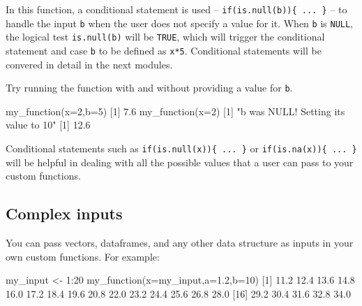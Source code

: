 \documentclass[
]{book}
\newenvironment{Shaded}{\begin{snugshade}}{\end{snugshade}}
\newcommand{\AttributeTok}[1]{\textcolor[rgb]{0.77,0.63,0.00}{#1}}
\newcommand{\DecValTok}[1]{\textcolor[rgb]{0.00,0.00,0.81}{#1}}
\newcommand{\FloatTok}[1]{\textcolor[rgb]{0.00,0.00,0.81}{#1}}
\newcommand{\FunctionTok}[1]{\textcolor[rgb]{0.00,0.00,0.00}{#1}}
\newcommand{\NormalTok}[1]{#1}
\newcommand{\OtherTok}[1]{\textcolor[rgb]{0.56,0.35,0.01}{#1}}
\newcommand{\SpecialCharTok}[1]{\textcolor[rgb]{0.00,0.00,0.00}{#1}}
\newcommand{\StringTok}[1]{\textcolor[rgb]{0.31,0.60,0.02}{#1}}
\begin{document}
In this function, a conditional statement is used -- \texttt{if(is.null(b))\{\ ...\ \}} -- to handle the input \texttt{b} when the user does not specify a value for it. When \texttt{b} is \texttt{NULL}, the logical test \texttt{is.null(b)} will be \texttt{TRUE}, which will trigger the conditional statement and case \texttt{b} to be defined as \texttt{x*5}. Conditional statements will be convered in detail in the next modules.

Try running the function with and without providing a value for \texttt{b}.

\begin{Shaded}
\begin{Highlighting}[]
\FunctionTok{my\_function}\NormalTok{(}\AttributeTok{x=}\DecValTok{2}\NormalTok{,}\AttributeTok{b=}\DecValTok{5}\NormalTok{)}
\NormalTok{[}\DecValTok{1}\NormalTok{] }\FloatTok{7.6}
\FunctionTok{my\_function}\NormalTok{(}\AttributeTok{x=}\DecValTok{2}\NormalTok{)}
\NormalTok{[}\DecValTok{1}\NormalTok{] }\StringTok{"b was NULL! Setting its value to  10"}
\NormalTok{[}\DecValTok{1}\NormalTok{] }\FloatTok{12.6}
\end{Highlighting}
\end{Shaded}

Conditional statements such as \texttt{if(is.null(x))\{\ ...\ \}} or \texttt{if(is.na(x))\{\ ...\ \}} will be helpful in dealing with all the possible values that a user can pass to your custom functions.

\hypertarget{complex-inputs}{%
\subsection*{Complex inputs}\label{complex-inputs}}

You can pass vectors, dataframes, and any other data structure as inputs in your own custom functions. For example:

\begin{Shaded}
\begin{Highlighting}[]
\NormalTok{my\_input }\OtherTok{\textless{}{-}} \DecValTok{1}\SpecialCharTok{:}\DecValTok{20}
\FunctionTok{my\_function}\NormalTok{(}\AttributeTok{x=}\NormalTok{my\_input,}\AttributeTok{a=}\FloatTok{1.2}\NormalTok{,}\AttributeTok{b=}\DecValTok{10}\NormalTok{)}
\NormalTok{ [}\DecValTok{1}\NormalTok{] }\FloatTok{11.2} \FloatTok{12.4} \FloatTok{13.6} \FloatTok{14.8} \FloatTok{16.0} \FloatTok{17.2} \FloatTok{18.4} \FloatTok{19.6} \FloatTok{20.8} \FloatTok{22.0} \FloatTok{23.2} \FloatTok{24.4} \FloatTok{25.6} \FloatTok{26.8} \FloatTok{28.0}
\NormalTok{[}\DecValTok{16}\NormalTok{] }\FloatTok{29.2} \FloatTok{30.4} \FloatTok{31.6} \FloatTok{32.8} \FloatTok{34.0}
\end{Highlighting}
\end{Shaded}
\end{document}
